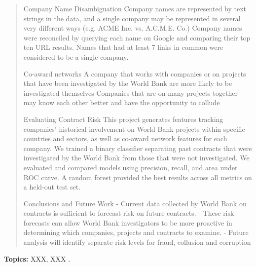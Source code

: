 \begin{quotation}
 Company Name Disambiguation
Company names are represented by text strings in the data, and a single company may be represented in several very different ways (e.g. ACME Inc. vs. A.C.M.E. Co.)
Company names were reconciled by querying each name on Google and comparing their top ten URL results. Names that had at least 7 links in common were considered to be a single company.

 Co-award networks
A company that works with companies or on projects that have been investigated by the World Bank are more likely to be investigated themselves
Companies that are on many projects together may know each other better and have the opportunity to collude

 Evaluating Contract Risk
This project generates features tracking companies’ historical involvement on World Bank projects within specific countries and sectors, as well as co-award network features for each company. We trained a binary classifier separating past contracts that were investigated by the World Bank from those that were not investigated. We evaluated and compared models using precision, recall, and area under ROC curve. A random forest provided the best results across all metrics on a held-out test set.

 Conclusions and Future Work
- Current data collected by World Bank on contracts is sufficient to forecast risk on future contracts.
- These risk forecasts can allow World Bank investigators to be more proactive in determining which companies, projects and contracts to examine.
- Future analysis will identify separate risk levels for fraud, collusion and corruption
\end{quotation}

\vfill
\small
\noindent \textbf{Topics:} XXX, XXX .
\normalsize